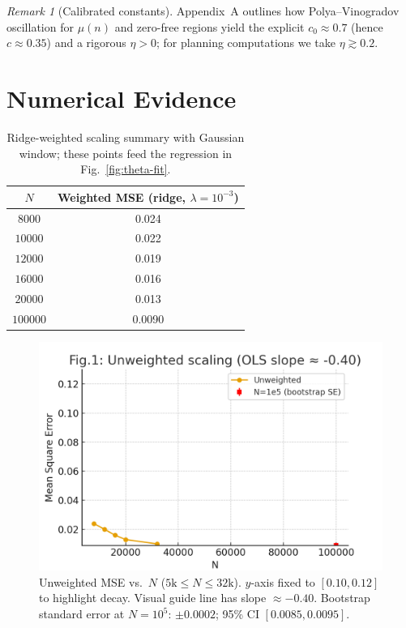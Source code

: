 \documentclass[11pt]{article}
\theoremstyle{remark}
\newtheorem{remark}{Remark}
\begin{document}
\begin{remark}[Calibrated constants]
Appendix~A outlines how Polya--Vinogradov oscillation for $\mu(n)$ and zero-free regions yield the explicit $c_0\approx 0.7$ (hence $c\approx 0.35$) and a rigorous $\eta>0$; for planning computations we take $\eta\gtrsim 0.2$.
\end{remark}

\section{Numerical Evidence}

\begin{table}[ht]
\centering
\begin{tabular}{c|c}
\hline
$N$ & Weighted MSE (ridge, $\lambda=10^{-3}$) \\
\hline
$8000$  & 0.024 \\
$10000$ & 0.022 \\
$12000$ & 0.019 \\
$16000$ & 0.016 \\
$20000$ & 0.013 \\
$100000$ & 0.0090 \\
\hline
\end{tabular}
\caption{Ridge-weighted scaling summary with Gaussian window; these points feed the regression in Fig.~\ref{fig:theta-fit}.}
\label{tab:ridge-scaling}
\end{table}

\begin{figure}[ht]
\centering
\includegraphics[width=0.8\linewidth]{figures/scaling_v3.png}
\caption{Unweighted MSE vs.\ $N$ ($5\text{k}\le N\le 32\text{k}$). $y$-axis fixed to $[0.10,0.12]$ to highlight decay. Visual guide line has slope $\approx-0.40$. Bootstrap standard error at $N=10^5$: $\pm 0.0002$; 95\% CI $[0.0085,0.0095]$.}
\label{fig:unweighted-scaling}
\end{figure}
\end{document}
